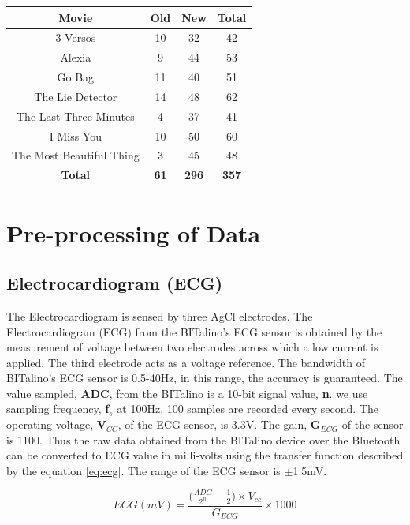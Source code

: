 \begin{center}
\begin{tabular}{ |c|c|c|c| }
\hline
Movie & Old & New & Total \\
\hline
\hline
3 Versos & 10 & 32 & 42 \\
\hline
Alexia & 9 & 44 & 53 \\
\hline
Go Bag & 11 & 40 & 51 \\
\hline
The Lie Detector & 14 & 48 & 62 \\
\hline
The Last Three Minutes & 4 & 37 & 41 \\
\hline
I Miss You & 10 & 50 & 60 \\
\hline
The Most Beautiful Thing & 3 & 45 & 48 \\
\hline
\textbf{Total} & \textbf{61} & \textbf{296} & \textbf{357} \\
\hline
\end{tabular}
\label{tab:eda_data_set}
\end{center}

\section{Pre-processing of Data}
\label{sec:preprocessing}
\subsection{Electrocardiogram (ECG)}
\label{sec:ecg_feature_extraction}
The Electrocardiogram is sensed by three AgCl electrodes. The Electrocardiogram (ECG) from the BITalino's ECG sensor is obtained by the measurement of voltage between two electrodes across which a low current is applied. The third electrode acts as a voltage reference. The bandwidth of BITalino's ECG sensor is 0.5-40Hz, in this range, the accuracy is guaranteed. The value sampled, \textbf{ADC}, from the BITalino is a 10-bit signal value, \textbf{n}. we use sampling frequency, \textbf{f$_{s}$} at 100Hz, 100 samples are recorded every second. The operating voltage, \textbf{V$_{CC}$}, of the ECG sensor, is 3.3V. The gain, \textbf{G$_{ECG}$} of the sensor is 1100. Thus the raw data obtained from the BITalino device over the Bluetooth can be converted to ECG value in milli-volts using the transfer function described by the equation \ref{eq:ecg}. The range of the ECG sensor is $\pm$1.5mV.

\begin{equation}
\label{eq:ecg}
    ECG(mV) = \frac{\big(\frac{ADC}{2^n} - \frac{1}{2})\times V_{cc}} {G_{ECG}}\times1000
\end{equation}

